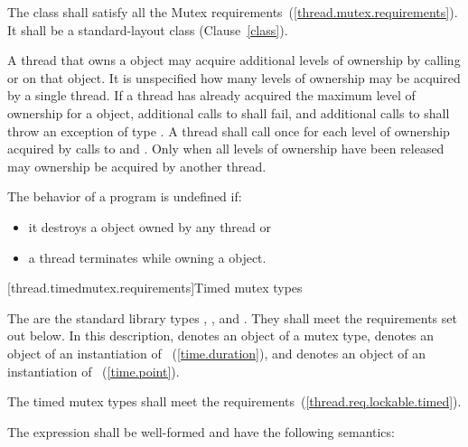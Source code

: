 \pnum
The class  shall satisfy all the Mutex
requirements~(\ref{thread.mutex.requirements}). It shall be a standard-layout
class (Clause~\ref{class}).

\pnum
A thread that owns a  object may acquire additional levels of
ownership by calling  or  on that object. It is
unspecified how many levels of ownership may be acquired by a single thread. If a thread
has already acquired the maximum level of ownership for a 
object, additional calls to  shall fail, and additional calls to
 shall throw an exception of type . A thread
shall call  once for each level of ownership acquired by calls to
 and . Only when all levels of ownership have been
released may ownership be acquired by another thread.

\pnum
The behavior of a program is undefined if:

\begin{itemize}
\item it destroys a  object owned by any thread or
\item a thread terminates while owning a  object.
\end{itemize}

[thread.timedmutex.requirements]{Timed mutex types}

\pnum
The  are the standard library types ,
, and . They shall
meet the requirements set out below.
In this description,  denotes an object of a mutex type,
 denotes an object of an
instantiation of ~(\ref{time.duration}), and  denotes an
object of an
instantiation of ~(\ref{time.point}).

\pnum
The timed mutex types shall meet the 
requirements~(\ref{thread.req.lockable.timed}).

\pnum
The expression  shall be well-formed and have the
following semantics:

